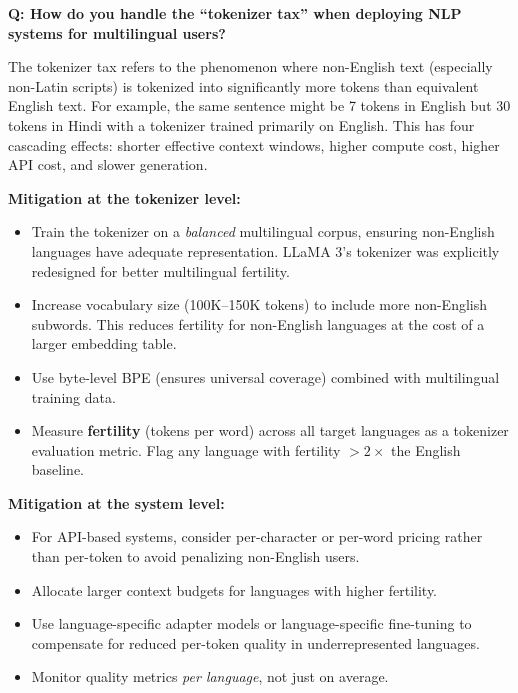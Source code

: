 \begin{interviewq}
\textbf{Q: How do you handle the ``tokenizer tax'' when deploying NLP systems for
multilingual users?}

 \quad {} \quad \badgefreq{\freqmed}

\stronganswer
The tokenizer tax refers to the phenomenon where non-English text (especially non-Latin
scripts) is tokenized into significantly more tokens than equivalent English text.  For
example, the same sentence might be 7 tokens in English but 30 tokens in Hindi with a
tokenizer trained primarily on English.  This has four cascading effects: shorter
effective context windows, higher compute cost, higher API cost, and slower generation.

\textbf{Mitigation at the tokenizer level:}
\begin{itemize}
    \item Train the tokenizer on a \emph{balanced} multilingual corpus, ensuring
          non-English languages have adequate representation.  LLaMA 3's tokenizer was
          explicitly redesigned for better multilingual fertility.
    \item Increase vocabulary size (100K--150K tokens) to include more non-English
          subwords.  This reduces fertility for non-English languages at the cost of
          a larger embedding table.
    \item Use byte-level BPE (ensures universal coverage) combined with multilingual
          training data.
    \item Measure \textbf{fertility} (tokens per word) across all target languages as a
          tokenizer evaluation metric.  Flag any language with fertility $>$$2\times$
          the English baseline.
\end{itemize}

\textbf{Mitigation at the system level:}
\begin{itemize}
    \item For API-based systems, consider per-character or per-word pricing rather than
          per-token to avoid penalizing non-English users.
    \item Allocate larger context budgets for languages with higher fertility.
    \item Use language-specific adapter models or language-specific fine-tuning to
          compensate for reduced per-token quality in underrepresented languages.
    \item Monitor quality metrics \emph{per language}, not just on average.
\end{itemize}


\end{interviewq}
